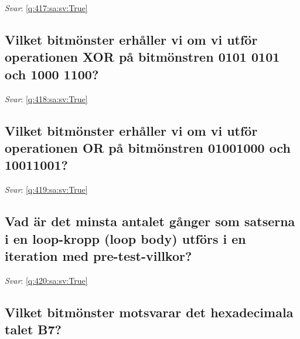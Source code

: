 \documentclass[a4paper,11pt,oneside]{article}
\begin{document}
\begin{sloppypar}
\vspace{1cm}

\textit{Svar}: \autoref{q:417:sa:sv:True}



\subsection{Vilket bitm\"onster erh\r{a}ller vi om vi utf\"or operationen XOR p\r{a} bitm\"onstren 0101 0101 och 1000 1100?}

\label{q:418:sa:sv:False}

\vspace{2cm}

\noindent\makebox[\textwidth]{\hrulefill}

\vspace{1cm}

\textit{Svar}: \autoref{q:418:sa:sv:True}



\subsection{Vilket bitm\"onster erh\r{a}ller vi om vi utf\"or operationen OR p\r{a} bitm\"onstren 01001000 och 10011001?}

\label{q:419:sa:sv:False}

\vspace{2cm}

\noindent\makebox[\textwidth]{\hrulefill}

\vspace{1cm}

\textit{Svar}: \autoref{q:419:sa:sv:True}



\subsection{Vad \"ar det minsta antalet g\r{a}nger som satserna i en loop-kropp (loop body) utf\"ors i en iteration med pre-test-villkor?}

\label{q:420:sa:sv:False}

\vspace{2cm}

\noindent\makebox[\textwidth]{\hrulefill}

\vspace{1cm}

\textit{Svar}: \autoref{q:420:sa:sv:True}



\subsection{Vilket bitm\"onster motsvarar det hexadecimala talet B7?}


\end{sloppypar}
\end{document}
